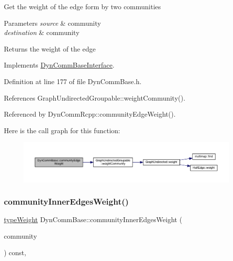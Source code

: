 Get the weight of the edge form by two communities


\begin{DoxyParams}{Parameters}
{\em source} & community \\
\hline
{\em destination} & community \\
\hline
\end{DoxyParams}
\begin{DoxyReturn}{Returns}
the weight of the edge 
\end{DoxyReturn}


Implements \hyperlink{classDynCommBaseInterface_a17c322600ba39050005153845dfd3021}{Dyn\+Comm\+Base\+Interface}.



Definition at line 177 of file Dyn\+Comm\+Base.\+h.



References Graph\+Undirected\+Groupable\+::weight\+Community().



Referenced by Dyn\+Comm\+Rcpp\+::community\+Edge\+Weight().

Here is the call graph for this function\+:\nopagebreak
\begin{figure}[H]
\begin{center}
\leavevmode
\includegraphics[width=350pt]{classDynCommBase_a1ef408ec71d82b008fc0229416c77b61_cgraph}
\end{center}
\end{figure}
\mbox{\label{classDynCommBase_ada91e7e914eb8be7f8c25f4c0c81156a}} 
\subsubsection{\texorpdfstring{community\+Inner\+Edges\+Weight()}{communityInnerEdgesWeight()}}
{\footnotesize\ttfamily \hyperlink{edge_8h_a2e7ea3be891ac8b52f749ec73fee6dd2}{type\+Weight} Dyn\+Comm\+Base\+::community\+Inner\+Edges\+Weight (\begin{DoxyParamCaption}\item[{\hyperlink{graphUndirectedGroupable_8h_a914da95c9ea7f14f4b7f875c36818556}{type\+Community}}]{community }\end{DoxyParamCaption}) const\hspace{0.3cm}{\ttfamily [inline]}, {\ttfamily [virtual]}}

